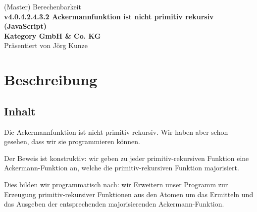 \documentclass[a4paper]{amsart}
\theoremstyle{definition}
\begin{document}
\begin{titlepage}
\centering
{\huge
(Master) Berechenbarkeit\\[1cm]
\textbf{v4.0.4.2.4.3.2 Ackermannfunktion ist nicht primitiv rekursiv (JavaScript)}
}\\[1cm]

\textbf{Kategory GmbH \& Co. KG}\\
Pr\"asentiert von Jörg Kunze

\end{titlepage}

%

\newpage

\section*{Beschreibung}

\subsection*{Inhalt}
Die Ackermannfunktion ist nicht primitiv rekursiv. Wir haben aber schon gesehen, dass wir sie programmieren können.

Der Beweis ist konstruktiv: wir geben zu jeder primitiv-rekursiven Funktion eine Ackermann-Funktion an, welche die primitiv-rekursiven Funktion majorisiert. 

Dies bilden wir programmatisch nach: wir Erweitern unser Programm zur Erzeugung primitiv-rekursiver Funktionen aus den Atomen um das Ermitteln und das Ausgeben der entsprechenden majorisierenden Ackermann-Funktion.
\end{document}
